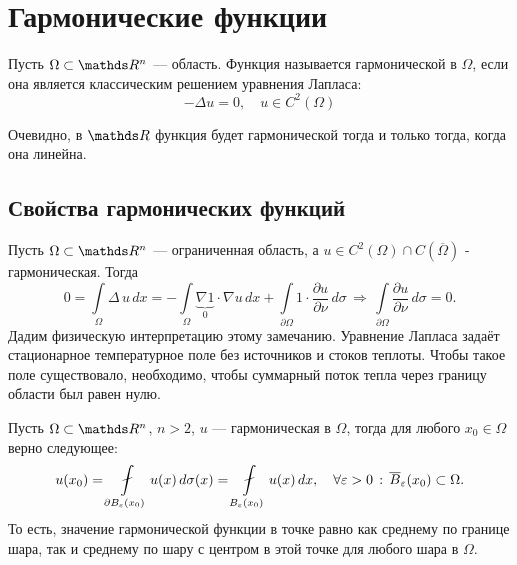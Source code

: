 
\section{Гармонические функции}
\begin{definition} Пусть $\Omega \subset \real^n$ --- область. Функция называется гармонической в $\Omega$, если она является классическим решением уравнения Лапласа:
$$-\Delta u = 0, \quad u \in C^2(\Omega)$$
\end{definition}
\begin{note}
Очевидно, в $\real$ функция будет гармонической тогда и только тогда, когда она линейна.
\end{note}

\subsection{Свойства гармонических функций}
\begin{note}
Пусть $\Omega \subset \real^n$ --- ограниченная область, а $u \in C^2(\Omega)\cap C(\overline{\Omega})$ - гармоническая. Тогда 
$$0 = \int \limits_\Omega \Delta \, u \,dx = -\int \limits_\Omega \underbrace {\nabla 1}_{0} \cdot \nabla u \, dx + \int \limits_{\partial\Omega} 1 \cdot \dfrac{\partial u}{\partial \nu} \, d\sigma\,\Rightarrow\, \int\limits_{\partial\Omega}\dfrac{\partial u}{\partial \nu} \, d\sigma = 0.$$
Дадим физическую интерпретацию этому замечанию. Уравнение Лапласа задаёт стационарное температурное поле без источников и стоков теплоты. Чтобы такое поле существовало, необходимо, чтобы суммарный поток тепла через границу области был равен нулю.
\end{note}

\begin{theorem}
Пусть $\Omega \subset \real^n$, $n > 2$, $u$ --- гармоническая в $\Omega$, тогда для любого $x_0 \in \Omega$ верно следующее:
$$u(x_0) = \fint \limits_{\partial B_\eps(x_0)} u(x) \, d\sigma(x) = \fint \limits_{B_\eps(x_0)} u(x) \, dx, \quad \forall \eps > 0 \,:\, \overline{B}_\eps(x_0)\subset\Omega.$$
То есть, значение гармонической функции в точке равно как среднему по границе шара, так и среднему по шару с центром в этой точке для любого шара в $\Omega$.
\end{theorem}

